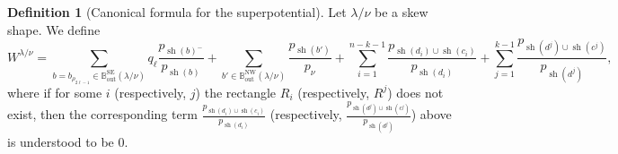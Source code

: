 \documentclass{amsart}
\theoremstyle{definition}
\newtheorem{definition}[thm]{Definition}
\numberwithin{equation}{section}
\def\sh{\operatorname{sh}}
\def\NW{\operatorname{NW}}
\def\SE{\operatorname{SE}}
\def\out{\operatorname{out}}
\newcommand{\BB}{{\mathbb B}}
\begin{document}
\begin{definition}[Canonical formula for the superpotential]\label{d:skewLG1}
Let $\lambda/\nu$ be a skew shape.  We define
\begin{equation}\label{e:anotherSchub}
W^{\lambda/\nu} 
        = 
	\sum_{b=b_{\rho_{2\ell-1}} \in \BB^{\SE}_{\out}(\lambda/\nu)}  
        q_\ell \frac{p_{\sh(b)^-}}{p_{\sh(b)}}+
	\sum_{b'\in \BB^{\NW}_{\out}(\lambda/\nu)} \frac{p_{\sh(b')}}{p_{\nu}} 
+        \sum_{i=1}^{n-k-1} 
	\frac{p_{\sh(d_i) \cup \sh(c_i)}}{p_{\sh(d_i)}}
        + \sum_{j=1}^{k-1} 
	\frac{p_{\sh(d^j) \cup \sh(c^j)}}{p_{\sh(d^j)}},
\end{equation}
	where if for some $i$ (respectively, $j$) the rectangle 
	$R_i$ (respectively, $R^j$) does not exist, then
	the corresponding term 
	$\frac{p_{\sh(d_i) \cup \sh(c_i)}}{p_{\sh(d_i)}}$
	(respectively, 
	$\frac{p_{\sh(d^j) \cup \sh(c^j)}}{p_{\sh(d^j)}}$)
	above is understood to be $0$.
\end{definition}
\end{document}
